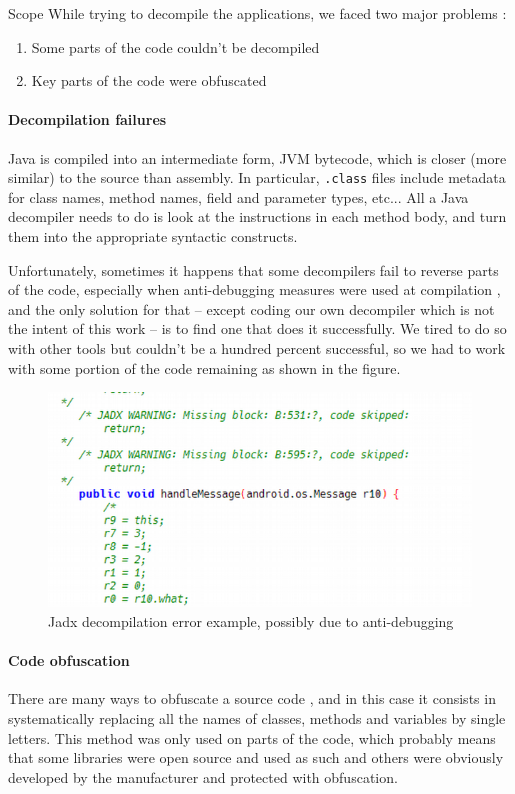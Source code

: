 \begin{chaptercover}{Scope}
\vspace{1cm}
While trying to decompile the applications, we faced two major problems :

\begin{enumerate}
  \item Some parts of the code couldn’t be decompiled
  \item Key parts of the code were obfuscated
\end{enumerate}

\paragraph{Decompilation failures} Java is compiled into an intermediate form, JVM bytecode, which is closer (more similar) to the source than assembly. In particular, \texttt{.class} files include metadata for class names, method names, field and parameter types, etc... All a Java decompiler needs to do is look at the instructions in each method body, and turn them into the appropriate syntactic constructs.

Unfortunately, sometimes it happens that some decompilers fail to reverse parts of the code, especially when anti-debugging measures were used at compilation \cite{anti-debugging}, and the only solution for that -- except coding our own decompiler which is not the intent of this work -- is to find one that does it successfully. We tired to do so with other tools but couldn’t be a hundred percent successful, so we had to work with some portion of the code remaining as shown in the figure.

\begin{figure}[H]
  \centering
  \includegraphics[width=.5\linewidth]{figures/jadx-decompilation-error}
  \caption{Jadx decompilation error example, possibly due to anti-debugging}
\end{figure}

\paragraph{Code obfuscation} There are many ways to obfuscate a source code \cite{code-obfuscation}, and in this case it consists in systematically replacing all the names of classes, methods and variables by single letters. This method was only used on parts of the code, which probably means that some libraries were open source and used as such and others were obviously developed by the manufacturer and protected with obfuscation.


\end{chaptercover}
